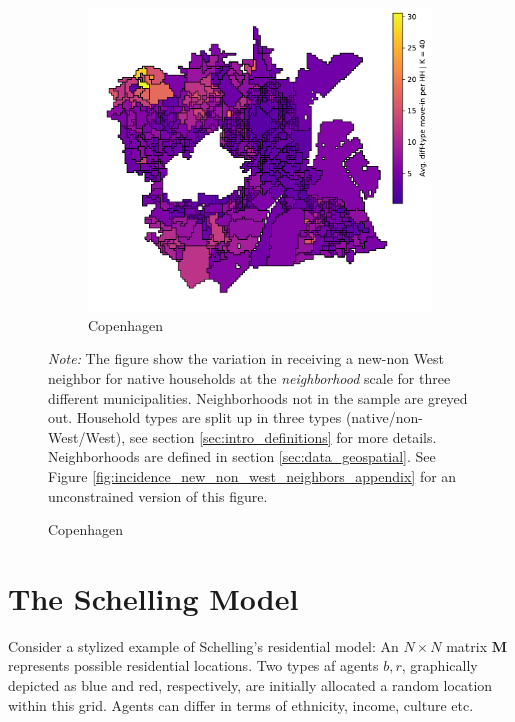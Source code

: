 \documentclass[../main.tex]{subfiles}
\begin{document}
\begin{figure}
    \begin{subfigure}{.65\textwidth}	
	\centering
	\includegraphics[width=\textwidth]{figs/cph_howdy_neighbor.pdf}	
	\caption{Copenhagen}
	\end{subfigure}	
\begin{tablenotes}
\item \footnotesize \textit{Note:} The figure show the variation in receiving a new-non West neighbor for native households at the \textit{neighborhood} scale for three different municipalities. Neighborhoods not in the sample are greyed out. Household types are split up in three types (native/non-West/West), see section \ref{sec:intro_definitions} for more details. Neighborhoods are defined in section \ref{sec:data_geospatial}. See Figure \ref{fig:incidence_new_non_west_neighbors_appendix} for an unconstrained version of this figure.
\end{tablenotes}
\label{fig:incidence_new_non_west_neighbors}
\end{figure}

\section{The Schelling Model}

\label{sec:appendix_schelling}

Consider a stylized example of Schelling's residential model: 
An $N \times N$ matrix $\textbf{M}$ represents possible residential locations. Two types af agents $b, r$, graphically depicted as blue and red, respectively, are initially allocated a random location within this grid. Agents can differ in terms of ethnicity, income, culture etc. 
\end{document}

